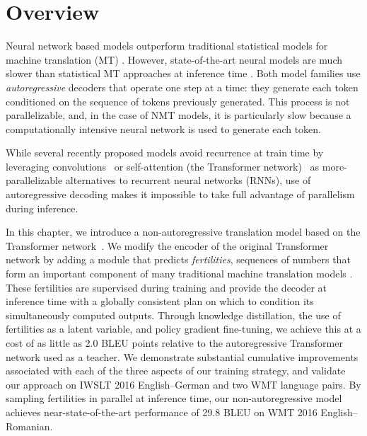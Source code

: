 \def \model{NAT}

\section{Overview}
Neural network based models outperform traditional statistical models for machine translation (MT) \citep{bahdanau2014neural,luong2015effective}. 
However, state-of-the-art neural models are much slower than statistical MT approaches at inference time \citep{wu2016google}.
Both model families use \emph{autoregressive} decoders that operate one step at a time: they generate each token conditioned on the sequence of tokens previously generated. This process is not parallelizable, and, in the case of NMT models, it is particularly slow because a computationally intensive neural network is used to generate each token.

While several recently proposed models avoid recurrence at train time by leveraging convolutions~\citep{kalchbrenner2016neural, gehring2017convolutional, kaiser2017depthwise} or self-attention (the Transformer network)~\citep{vaswani2017attention} as more-parallelizable alternatives to recurrent neural networks (RNNs), use of autoregressive decoding makes it impossible to take full advantage of parallelism during inference.

In this chapter, we introduce a non-autoregressive translation model based on the Transformer network~\citep{vaswani2017attention}. We modify the encoder of the original Transformer network by adding a module that predicts \emph{fertilities}, sequences of numbers that form an important component of many traditional machine translation models \citep{brown1993mathematics}. These fertilities are supervised during training and provide the decoder at inference time with a globally consistent plan on which to condition its simultaneously computed outputs. Through knowledge distillation, the use of fertilities as a latent variable, and policy gradient fine-tuning, we achieve this at a cost of as little as 2.0 BLEU points relative to the autoregressive Transformer network used as a teacher.
We demonstrate substantial cumulative improvements associated with each of the three aspects of our training strategy, and validate our approach on IWSLT 2016 English--German and two WMT language pairs. By sampling fertilities in parallel at inference time, our non-autoregressive model achieves near-state-of-the-art performance of 29.8 BLEU on WMT 2016 English--Romanian.

